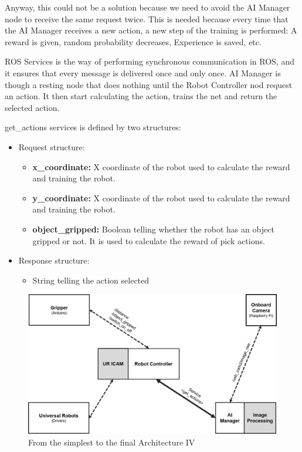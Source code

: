 		Anyway, this could not be a solution because we need to avoid the AI Manager node to receive the same request twice. This is needed because every time that the AI Manager receives a new action, a new step of the training is performed: A reward is given, random probability decreases, Experience is saved, etc.
		
		ROS Services is the way of performing synchronous communication in ROS, and it ensures that every message is delivered once and only once. AI Manager is though a resting node that does nothing until the Robot Controller nod request an action. It then start calculating the action, trains the net and return the selected action.
		
		get\_actions services is defined by two structures:
		
		\begin{itemize}
			\item[\textendash]Request structure:
			\begin{itemize}
				\item[\textendash]\textbf{x\_coordinate:} X coordinate of the robot used to calculate the reward and training the robot.
				\item[\textendash]\textbf{y\_coordinate:} X coordinate of the robot used to calculate the reward and training the robot.
				\item[\textendash]\textbf{object\_gripped:} Boolean telling whether the robot has an object gripped or not. It is used to calculate the reward of pick actions.
			\end{itemize}
			\item[\textendash]Response structure:
			\begin{itemize}
				\item[\textendash]String telling the action selected
			\end{itemize}
		\end{itemize}
	
		\begin{figure}[H]
			\centering
			\includegraphics[width=0.7\linewidth]{Images/ArchitectureIV}
			\caption[Architecture IV]{From the simplest to the final Architecture IV}
			\label{fig:architectureiV}
		\end{figure}
	
